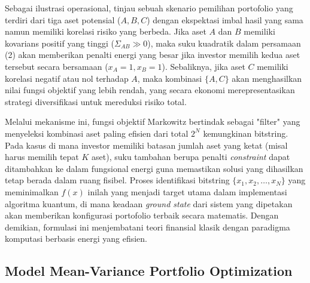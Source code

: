 \begin{example}
    Sebagai ilustrasi operasional, tinjau sebuah skenario pemilihan portofolio yang terdiri dari tiga aset potensial ($A, B, C$) dengan ekspektasi imbal hasil yang sama namun memiliki korelasi risiko yang berbeda. Jika aset $A$ dan $B$ memiliki kovarians positif yang tinggi ($\Sigma_{AB} \gg 0$), maka suku kuadratik dalam persamaan (2) akan memberikan penalti energi yang besar jika investor memilih kedua aset tersebut secara bersamaan ($x_A=1, x_B=1$). Sebaliknya, jika aset $C$ memiliki korelasi negatif atau nol terhadap $A$, maka kombinasi $\{A, C\}$ akan menghasilkan nilai fungsi objektif yang lebih rendah, yang secara ekonomi merepresentasikan strategi diversifikasi untuk mereduksi risiko total.

    Melalui mekanisme ini, fungsi objektif Markowitz bertindak sebagai "filter" yang menyeleksi kombinasi aset paling efisien dari total $2^N$ kemungkinan bitstring. Pada kasus di mana investor memiliki batasan jumlah aset yang ketat (misal harus memilih tepat $K$ aset), suku tambahan berupa penalti \textit{constraint} dapat ditambahkan ke dalam fungsional energi guna memastikan solusi yang dihasilkan tetap berada dalam ruang fisibel. Proses identifikasi bitstring $\{x_1, x_2, \dots, x_N\}$ yang meminimalkan $f(x)$ inilah yang menjadi target utama dalam implementasi algoritma kuantum, di mana keadaan \textit{ground state} dari sistem yang dipetakan akan memberikan konfigurasi portofolio terbaik secara matematis. Dengan demikian, formulasi ini menjembatani teori finansial klasik dengan paradigma komputasi berbasis energi yang efisien.
\end{example}

\subsection{Model Mean-Variance Portfolio Optimization}

